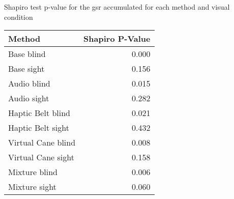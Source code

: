 
\centering
\caption{Shapiro test p-value for the gsr accumulated for each method and visual condition}
\label{tab:shapiro_gsr_sum}
\begin{tabular}{lr}
\toprule
            Method &  Shapiro P-Value \\
\midrule
        Base blind &            0.000 \\
        Base sight &            0.156 \\
       Audio blind &            0.015 \\
       Audio sight &            0.282 \\
 Haptic Belt blind &            0.021 \\
 Haptic Belt sight &            0.432 \\
Virtual Cane blind &            0.008 \\
Virtual Cane sight &            0.158 \\
     Mixture blind &            0.006 \\
     Mixture sight &            0.060 \\
\bottomrule
\end{tabular}
